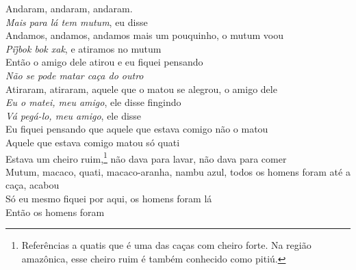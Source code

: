 \begin{linenumbers}\begingroup\raggedright
 
\noindent   Andaram, andaram, andaram.\\
  \emph{Mais para lá tem mutum}, eu disse\\
  Andamos, andamos, andamos mais um pouquinho, o mutum voou\\
  \emph{\emph{Pij̃bok bok xak}}, e atiramos no mutum\\
  Então o amigo dele atirou e eu fiquei pensando\\
  \emph{Não se pode matar caça do outro}\\
  Atiraram, atiraram, aquele que o matou se alegrou, o amigo dele\\
  \emph{Eu o matei, meu amigo}, ele disse fingindo\\
  \emph{Vá pegá-lo, meu amigo}, ele disse\\
  Eu fiquei pensando que aquele que estava comigo não o matou\\
  Aquele que estava comigo matou só quati\\
  Estava um cheiro ruim,\footnote{Referências a quatis que é uma das caças com cheiro forte. Na região amazônica, esse cheiro ruim é também conhecido como pitiú.} não dava para lavar, não dava para comer\\
  Mutum, macaco, quati, macaco-aranha, nambu azul, todos os homens
 foram até a caça, acabou\\
  Só eu mesmo fiquei por aqui, os homens foram lá\\
  Então os homens foram
 
\end{linenumbers}\endgroup

